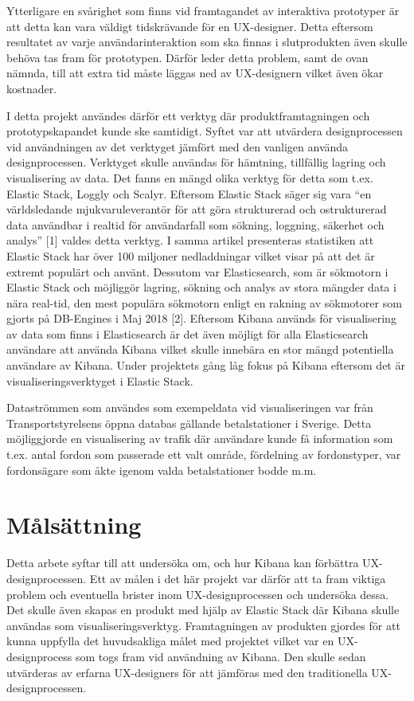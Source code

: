 \documentclass{kththesis}
\begin{document}
Ytterligare en svårighet som finns vid framtagandet av interaktiva prototyper är att detta kan vara väldigt tidskrävande för en UX-designer. Detta eftersom resultatet av varje användarinteraktion som ska finnas i slutprodukten även skulle behöva tas fram för prototypen. Därför leder detta problem, samt de ovan nämnda, till att extra tid måste läggas ned av UX-designern vilket även ökar kostnader. 

I detta projekt användes därför ett verktyg där produktframtagningen och prototypskapandet kunde ske samtidigt. Syftet var att utvärdera designprocessen vid användningen av det verktyget jämfört med den vanligen använda designprocessen. Verktyget skulle användas för hämtning, tillfällig lagring och visualisering av data. Det fanns en mängd olika verktyg för detta som t.ex. Elastic Stack, Loggly och Scalyr. Eftersom Elastic Stack säger sig vara “en världsledande mjukvaruleverantör för att göra strukturerad och ostrukturerad data användbar i realtid för användarfall som sökning, loggning, säkerhet och analys” [1] valdes detta verktyg. I samma artikel presenteras statistiken att Elastic Stack har över 100 miljoner nedladdningar vilket visar på att det är extremt populärt och använt. Dessutom var Elasticsearch, som är sökmotorn i Elastic Stack och möjliggör lagring, sökning och analys av stora mängder data i nära real-tid, den mest populära sökmotorn enligt en rakning av sökmotorer som gjorts på DB-Engines i Maj 2018 [2]. Eftersom Kibana används för visualisering av data som finns i Elasticsearch är det även möjligt för alla Elasticsearch användare att använda Kibana vilket skulle innebära en stor mängd potentiella användare av Kibana. Under projektets gång låg fokus på Kibana eftersom det är visualiseringsverktyget i Elastic Stack.

Dataströmmen som användes som exempeldata vid visualiseringen var från Transportstyrelsens öppna databas gällande betalstationer i Sverige. Detta möjliggjorde en visualisering av trafik där användare kunde få information som t.ex. antal fordon som passerade ett valt område, fördelning av fordonstyper, var fordonsägare som åkte igenom valda betalstationer bodde m.m.

\section{Målsättning}
Detta arbete syftar till att undersöka om, och hur Kibana kan förbättra UX-designprocessen. Ett av målen i det här projekt var därför att ta fram viktiga problem och eventuella brister inom UX-designprocessen och undersöka dessa. Det skulle även skapas en produkt med hjälp av Elastic Stack där Kibana skulle användas som visualiseringsverktyg. Framtagningen av produkten gjordes för att kunna uppfylla det huvudsakliga målet med projektet vilket var en UX-designprocess som togs fram vid användning av Kibana. Den skulle sedan utvärderas av erfarna UX-designers för att jämföras med den traditionella UX-designprocessen. 
\end{document}
